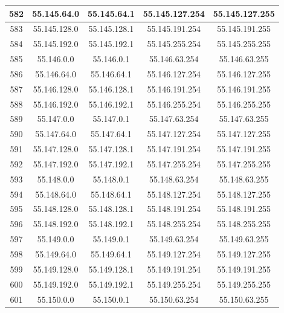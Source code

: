 \documentclass[letterpaper,12pt]{article}
\begin{document}
\begin{center}
\begin{longtable}{|c|c|c|c|c|}
                582 & 55.145.64.0 & 55.145.64.1 & 55.145.127.254 & 55.145.127.255 \\ \hline
                583 & 55.145.128.0 & 55.145.128.1 & 55.145.191.254 & 55.145.191.255 \\ \hline
                584 & 55.145.192.0 & 55.145.192.1 & 55.145.255.254 & 55.145.255.255 \\ \hline
                585 & 55.146.0.0 & 55.146.0.1 & 55.146.63.254 & 55.146.63.255 \\ \hline
                586 & 55.146.64.0 & 55.146.64.1 & 55.146.127.254 & 55.146.127.255 \\ \hline
                587 & 55.146.128.0 & 55.146.128.1 & 55.146.191.254 & 55.146.191.255 \\ \hline
                588 & 55.146.192.0 & 55.146.192.1 & 55.146.255.254 & 55.146.255.255 \\ \hline
                589 & 55.147.0.0 & 55.147.0.1 & 55.147.63.254 & 55.147.63.255 \\ \hline
                590 & 55.147.64.0 & 55.147.64.1 & 55.147.127.254 & 55.147.127.255 \\ \hline
                591 & 55.147.128.0 & 55.147.128.1 & 55.147.191.254 & 55.147.191.255 \\ \hline
                592 & 55.147.192.0 & 55.147.192.1 & 55.147.255.254 & 55.147.255.255 \\ \hline
                593 & 55.148.0.0 & 55.148.0.1 & 55.148.63.254 & 55.148.63.255 \\ \hline
                594 & 55.148.64.0 & 55.148.64.1 & 55.148.127.254 & 55.148.127.255 \\ \hline
                595 & 55.148.128.0 & 55.148.128.1 & 55.148.191.254 & 55.148.191.255 \\ \hline
                596 & 55.148.192.0 & 55.148.192.1 & 55.148.255.254 & 55.148.255.255 \\ \hline
                597 & 55.149.0.0 & 55.149.0.1 & 55.149.63.254 & 55.149.63.255 \\ \hline
                598 & 55.149.64.0 & 55.149.64.1 & 55.149.127.254 & 55.149.127.255 \\ \hline
                599 & 55.149.128.0 & 55.149.128.1 & 55.149.191.254 & 55.149.191.255 \\ \hline
                600 & 55.149.192.0 & 55.149.192.1 & 55.149.255.254 & 55.149.255.255 \\ \hline
                601 & 55.150.0.0 & 55.150.0.1 & 55.150.63.254 & 55.150.63.255 \\ \hline

\end{longtable}
\end{center}
\end{document}
